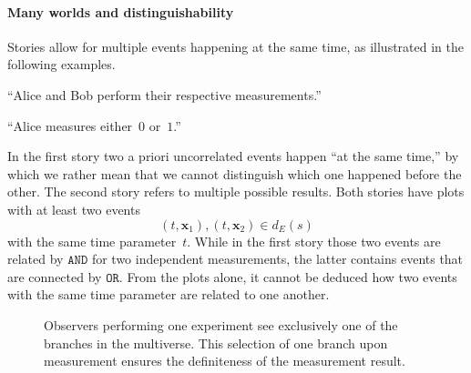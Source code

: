 \documentclass[aps,pra,12pt]{revtex4-2}
\newcommand{\AND}{\mathtt{AND}}
\newcommand{\OR}{\mathtt{OR}}
\theoremstyle{definition}
\theoremstyle{remark}
\begin{document}
\paragraph{Many worlds and distinguishability} Stories allow for multiple events happening at the same time, as illustrated in the following examples.
\begin{displayquote}
``Alice and Bob perform their respective measurements.''
\end{displayquote}
\begin{displayquote}
``Alice measures either~$0$ or~$1$.''
\end{displayquote}
In the first story two a priori uncorrelated events happen ``at the same time,'' by which we rather mean that we cannot distinguish which one happened before the other.
The second story refers to multiple possible results.
Both stories have plots with at least two events
\begin{equation*}
  (t, \bm{x}_1), (t,\bm{x}_2) \in d_E(s)
\end{equation*}
with the same time parameter~$t$.
While in the first story those two events are related by $\AND$ for two independent measurements, the latter contains events that are connected by $\OR$.
From the plots alone, it cannot be deduced how two events with the same time parameter are related to one another.
\begin{figure}
\begin{center}
\end{center}
\caption{Observers performing one experiment see exclusively one of the branches in the multiverse. This selection of one branch upon measurement ensures the definiteness of the measurement result.}
\label{fig:many worlds}
\end{figure}
\end{document}
